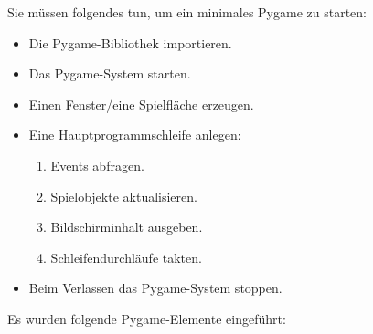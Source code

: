 Sie müssen folgendes tun, um ein minimales Pygame zu starten:
\begin{itemize}
    \item Die Pygame-Bibliothek importieren.
    \item Das Pygame-System starten.
    \item Einen Fenster/eine Spielfläche erzeugen.
    \item Eine Hauptprogrammschleife anlegen:
    \begin{enumerate}
        \item Events abfragen.
        \item Spielobjekte aktualisieren.
        \item Bildschirminhalt ausgeben.
        \item Schleifendurchläufe takten.
    \end{enumerate}
    \item Beim Verlassen das Pygame-System stoppen.
\end{itemize}

Es wurden folgende Pygame-Elemente eingeführt:

